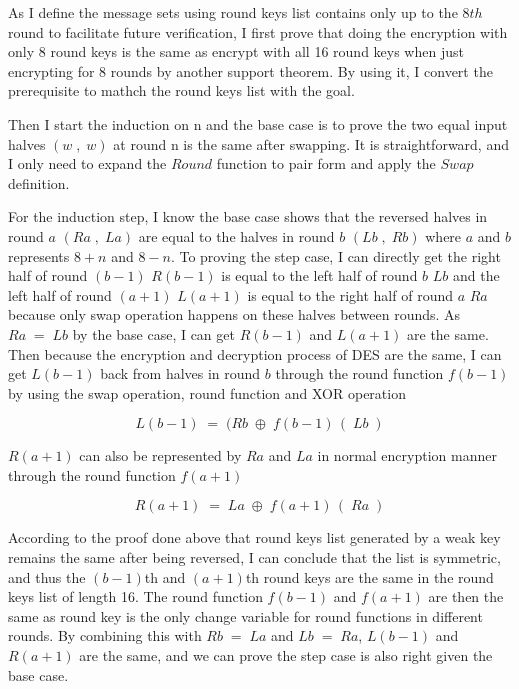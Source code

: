 \documentclass{article}
\begin{document}
As I define the message sets using round keys list contains only up to the $8th$ round to facilitate future verification,
I first prove that doing the encryption with only 8 round keys is the same as encrypt with all 16 round keys
when just encrypting for 8 rounds by another support theorem. By using it, I convert the prerequisite to mathch the
round keys list with the goal.

Then I start the induction on n and the base case is to prove the two equal input halves $(w\;,\;w)$ at round n is the same after
swapping. It is straightforward, and I only need to expand the $Round$ function to pair form and apply the $Swap$ definition.

For the induction step, I know the base case shows that the reversed halves in round $a$ $(Ra\;,\; La)$ are equal to
the halves in round $b$ $(Lb\;,\;Rb)$ where $a$ and $b$ represents $8+n$ and $8-n$.
To proving the step case, I can directly get the right half of round $(b-1)$ $R(b-1)$ is equal to the left half of round $b$
$Lb$ and
the left half of round $(a+1)$ $L(a+1)$ is equal to the right half of round $a$ $Ra$ because only swap operation happens on
these halves between rounds. As $Ra\;= \; Lb$ by the base case, I can get $R(b-1)$ and $L(a+1)$ are the same.
Then because the encryption and decryption process of DES are the same, I can get $L(b-1)$ back from halves in round $b$ through
the round function $f(b-1)$ by using the swap operation, round function and XOR operation

\begin{equation*}
L(b-1) \; = \; (Rb \; \oplus \; f(b-1)\,(\;Lb\;)
\end{equation*}

$R(a+1)$ can also be represented by $Ra$ and $La$ in normal encryption manner through the round function $f(a+1)$

\begin{equation*}
R(a+1) \; = \; La \; \oplus \; f(a+1)\,(\;Ra\;)
\end{equation*}

According to the proof
done above that round keys list generated by a weak key remains the same after being reversed, I can conclude that the list
is  symmetric, and thus the $(b-1)$th and $(a+1)$th round keys are the same in the round keys list of length 16.
The round function $f(b-1)$ and $f(a+1)$ are then the same as round key is the only change variable for round functions in different
rounds. By combining this with $Rb\;= \; La$ and $Lb\;= \; Ra$, $L(b-1)$ and $R(a+1)$ are the same, and we can prove the step
case is also right given the base case.
\end{document}
